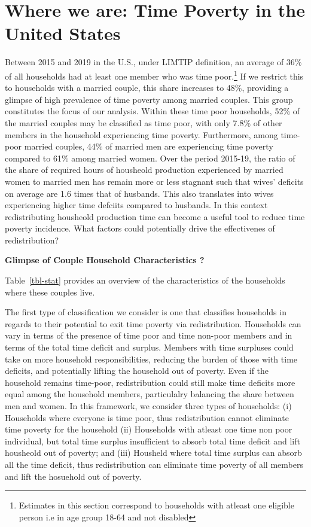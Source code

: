 \documentclass[
  11pt,
]{article}
\begin{document}
\section{Where we are: Time Poverty in the United
States}\label{where-we-are-time-poverty-in-the-united-states}

Between 2015 and 2019 in the U.S., under LIMTIP definition, an average
of 36\% of all households had at least one member who was time
poor.\footnote{Estimates in this section correspond to households with
  atleast one eligible person i.e in age group 18-64 and not disabled}
If we restrict this to households with a married couple, this share
increases to 48\%, providing a glimpse of high prevalence of time
poverty among married couples. This group constitutes the focus of our
analysis. Within these time poor households, 52\% of the married couples
may be classified as time poor, with only 7.8\% of other members in the
household experiencing time poverty. Furthermore, among time-poor
married couples, 44\% of married men are experiencing time poverty
compared to 61\% among married women. Over the period 2015-19, the ratio
of the share of required hours of housheold production experienced by
married women to married men has remain more or less stagnant such that
wives' deficits on average are 1.6 times that of husbands. This also
translates into wives experiencing higher time defciits compared to
husbands. In this context redistributing housheold production time can
become a useful tool to reduce time poverty incidence. What factors
could potentially drive the effectivenes of redistribution?

\textbf{Glimpse of Couple Household Characteristics ?}

Table~\ref{tbl-stat} provides an overview of the characteristics of the
households where these couples live.

The first type of classification we consider is one that classifies
households in regards to their potential to exit time poverty via
redistribution. Households can vary in terms of the presence of time
poor and time non-poor members and in terms of the total time deficit
and surplus. Members with time surpluses could take on more household
responsibilities, reducing the burden of those with time deficits, and
potentially lifting the household out of poverty. Even if the household
remains time-poor, redistribution could still make time deficits more
equal among the household members, particulalry balancing the share
between men and women. In this framework, we consider three types of
households: (i) Households where everyone is time poor, thus
redistribution cannot eliminate time poverty for the household (ii)
Households with atleast one time non poor individual, but total time
surplus insufficient to absorb total time deficit and lift housheold out
of poverty; and (iii) Housheld where total time surplus can absorb all
the time deficit, thus redistribution can eliminate time poverty of all
members and lift the hosuehold out of poverty.
\end{document}
